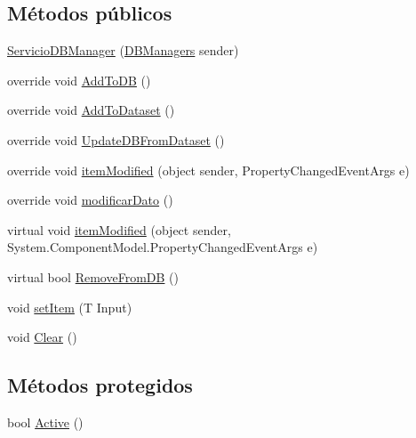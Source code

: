 \subsection*{Métodos públicos}
\begin{DoxyCompactItemize}
\item 
\hyperlink{class_proyecto___integrador__3_1_1_d_b_managers_1_1_servicio_d_b_manager_a409f1159870ced1800ab4ac735a94f72}{Servicio\-D\-B\-Manager} (\hyperlink{class_proyecto___integrador__3_1_1_d_b_managers}{D\-B\-Managers} sender)
\item 
override void \hyperlink{class_proyecto___integrador__3_1_1_d_b_managers_1_1_servicio_d_b_manager_abbc936c9fa59cae0fc302c44e6389876}{Add\-To\-D\-B} ()
\item 
override void \hyperlink{class_proyecto___integrador__3_1_1_d_b_managers_1_1_servicio_d_b_manager_a6da7980b7551fb67526270a28b7e3d35}{Add\-To\-Dataset} ()
\item 
override void \hyperlink{class_proyecto___integrador__3_1_1_d_b_managers_1_1_servicio_d_b_manager_a2ff2e7d573e60b876f4b183defc8675f}{Update\-D\-B\-From\-Dataset} ()
\item 
override void \hyperlink{class_proyecto___integrador__3_1_1_d_b_managers_1_1_servicio_d_b_manager_a2cf0e8f950669e7085314e8213b69d3e}{item\-Modified} (object sender, Property\-Changed\-Event\-Args e)
\item 
override void \hyperlink{class_proyecto___integrador__3_1_1_d_b_managers_1_1_servicio_d_b_manager_a903bee917e813d25c2e9a4ad87281db4}{modificar\-Dato} ()
\item 
virtual void \hyperlink{class_proyecto___integrador__3_1_1_d_b_managers_1_1_d_b_manager_3_01_t_01_4_a49ea2a7bfa58a2c536fefa4d60d488d2}{item\-Modified} (object sender, System.\-Component\-Model.\-Property\-Changed\-Event\-Args e)
\item 
virtual bool \hyperlink{class_proyecto___integrador__3_1_1_d_b_managers_1_1_d_b_manager_3_01_t_01_4_a436cb08914ca84122f9019a59485589a}{Remove\-From\-D\-B} ()
\item 
void \hyperlink{class_proyecto___integrador__3_1_1_d_b_managers_1_1_d_b_manager_3_01_t_01_4_a2d552a5e547efd19924ca4a96f685a56}{set\-Item} (T Input)
\item 
void \hyperlink{class_proyecto___integrador__3_1_1_d_b_managers_1_1_d_b_manager_3_01_t_01_4_ad5d7f99a4a5783514bad64ba8894e1ea}{Clear} ()
\end{DoxyCompactItemize}
\subsection*{Métodos protegidos}
\begin{DoxyCompactItemize}
\item 
bool \hyperlink{class_proyecto___integrador__3_1_1_d_b_managers_1_1_d_b_manager_3_01_t_01_4_add66e324cef43fd10b491bc697fa60b5}{Active} ()
\end{DoxyCompactItemize}
